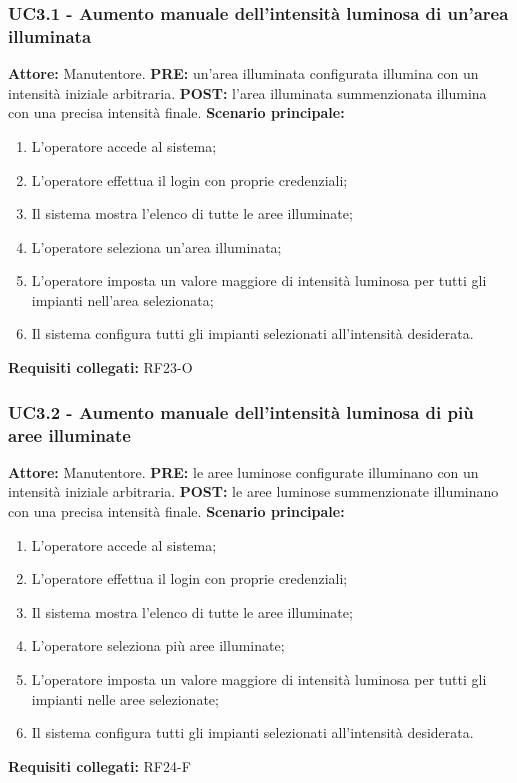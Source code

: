 \documentclass[a4paper, 12pt]{article}
\begin{document}
\subsubsection{UC3.1 - Aumento manuale dell'intensità luminosa di un'area illuminata}
\textbf{Attore:} Manutentore.\newline
\textbf{PRE:} un'area illuminata configurata illumina con un intensità iniziale arbitraria.\newline
\textbf{POST:} l'area illuminata summenzionata illumina con una precisa intensità finale.\newline
\textbf{Scenario principale:}
\begin{enumerate}
    \item L'operatore accede al sistema;
    \item L'operatore effettua il login con proprie credenziali;
    \item Il sistema mostra l'elenco di tutte le aree illuminate;
    \item L'operatore seleziona un'area illuminata;
    \item L'operatore imposta un valore maggiore di intensità luminosa per tutti gli impianti nell'area selezionata;
    \item Il sistema configura tutti gli impianti selezionati all'intensità desiderata.
\end{enumerate}
\textbf{Requisiti collegati:} RF23-O\newline

\subsubsection{UC3.2 - Aumento manuale dell'intensità luminosa di più aree illuminate}
\textbf{Attore:} Manutentore.\newline
\textbf{PRE:} le aree luminose configurate illuminano con un intensità iniziale arbitraria.\newline
\textbf{POST:} le aree luminose summenzionate illuminano con una precisa intensità finale.\newline
\textbf{Scenario principale:}
\begin{enumerate}
    \item L'operatore accede al sistema;
    \item L'operatore effettua il login con proprie credenziali;
    \item Il sistema mostra l'elenco di tutte le aree illuminate;
    \item L'operatore seleziona più aree illuminate;
    \item L'operatore imposta un valore maggiore di intensità luminosa per tutti gli impianti nelle aree selezionate;
    \item Il sistema configura tutti gli impianti selezionati all'intensità desiderata.
\end{enumerate}
\textbf{Requisiti collegati:} RF24-F\newline
\end{document}
